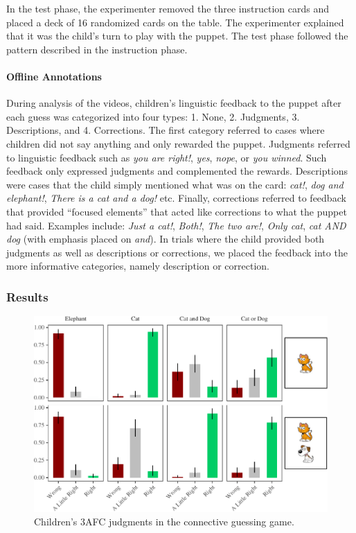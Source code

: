 \documentclass[floatsintext,man]{apa6}
\theoremstyle{definition}
\theoremstyle{definition}
\theoremstyle{definition}
\theoremstyle{remark}
\begin{document}
In the test phase, the experimenter removed the three instruction cards
and placed a deck of 16 randomized cards on the table. The experimenter
explained that it was the child's turn to play with the puppet. The test
phase followed the pattern described in the instruction phase.

\paragraph{Offline Annotations}\label{feedbackCoding}

During analysis of the videos, children's linguistic feedback to the
puppet after each guess was categorized into four types: 1. None, 2.
Judgments, 3. Descriptions, and 4. Corrections. The first category
referred to cases where children did not say anything and only rewarded
the puppet. Judgments referred to linguistic feedback such as \emph{you
are right!}, \emph{yes}, \emph{nope}, or \emph{you winned}. Such
feedback only expressed judgments and complemented the rewards.
Descriptions were cases that the child simply mentioned what was on the
card: \emph{cat!}, \emph{dog and elephant!}, \emph{There is a cat and a
dog!} etc. Finally, corrections referred to feedback that provided
\enquote{focused elements} that acted like corrections to what the
puppet had said. Examples include: \emph{Just a cat!}, \emph{Both!},
\emph{The two are!}, \emph{Only cat}, \emph{cat AND dog} (with emphasis
placed on \emph{and}). In trials where the child provided both judgments
as well as descriptions or corrections, we placed the feedback into the
more informative categories, namely description or correction.

\subsubsection{Results}\label{results-1}

\begin{figure}
\centering
\includegraphics{figs/childrenTernaryPlot-1.pdf}
\caption{\label{fig:childrenTernaryPlot}Children's 3AFC judgments in the
connective guessing game.}
\end{figure}
\end{document}
